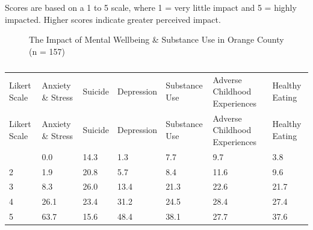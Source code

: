 \documentclass[
  english,
  letterpaper,
]{report}
\begin{document}
\begin{tcolorbox}[enhanced jigsaw, breakable, leftrule=.75mm, title=\textcolor{quarto-callout-note-color}{\faInfo}\hspace{0.5em}{Note}, bottomrule=.15mm, opacityback=0, left=2mm, colback=white, bottomtitle=1mm, coltitle=black, colbacktitle=quarto-callout-note-color!10!white, colframe=quarto-callout-note-color-frame, opacitybacktitle=0.6, toptitle=1mm, titlerule=0mm, arc=.35mm, rightrule=.15mm, toprule=.15mm]

Scores are based on a 1 to 5 scale, where 1 = very little impact and 5 =
highly impacted. Higher scores indicate greater perceived impact.

\end{tcolorbox}

\begin{figure}


\caption{\label{fig-oc-impact-mhsu}The Impact of Mental Wellbeing \&
Substance Use in Orange County (n = 157)}

\end{figure}%

\begin{longtable}[]{@{}lllllll@{}}

\caption{\label{tbl-oc-impact-mhsu}The Impact of Mental Wellbeing \&
Substance Use in Orange County (n = 157)}

\tabularnewline

\caption{}\label{T_16d4f}\tabularnewline
\toprule\noalign{}
Likert Scale & Anxiety \& Stress & Suicide & Depression & Substance Use
& Adverse Childhood Experiences & Healthy Eating \\
\midrule\noalign{}
\endfirsthead
\toprule\noalign{}
Likert Scale & Anxiety \& Stress & Suicide & Depression & Substance Use
& Adverse Childhood Experiences & Healthy Eating \\
\midrule\noalign{}
\endhead
\bottomrule\noalign{}
\endlastfoot
1 & 0.0 & 14.3 & 1.3 & 7.7 & 9.7 & 3.8 \\
2 & 1.9 & 20.8 & 5.7 & 8.4 & 11.6 & 9.6 \\
3 & 8.3 & 26.0 & 13.4 & 21.3 & 22.6 & 21.7 \\
4 & 26.1 & 23.4 & 31.2 & 24.5 & 28.4 & 27.4 \\
5 & 63.7 & 15.6 & 48.4 & 38.1 & 27.7 & 37.6 \\

\end{longtable}
\end{document}
